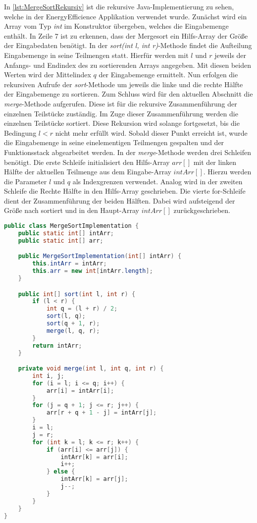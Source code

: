 In \autoref{lst:MergeSortRekursiv} ist die rekursive Java-Implementierung zu sehen, welche in der \glqq EnergyEfficience\grqq{} Applikation verwendet wurde. Zunächst wird ein Array vom Typ \emph{int} im Konstruktor übergeben, welches die Eingabemenge enthält. In Zeile 7 ist zu erkennen, dass der Mergesort ein Hilfs-Array der Größe der Eingabedaten benötigt. In der \emph{sort(int l, int r)}-Methode findet die Aufteilung Eingabemenge in seine Teilmengen statt. Hierfür werden mit $l$ und $r$ jeweils der Anfangs- und Endindex des zu sortierenden Arrays angegeben. Mit diesen beiden Werten wird der Mittelindex $q$ der Eingabemenge ermittelt. Nun erfolgen die rekursiven Aufrufe der \emph{sort}-Methode um jeweils die linke und die rechte Hälfte der Eingabemenge zu sortieren. Zum Schluss wird für den aktuellen Abschnitt die \emph{merge}-Methode aufgerufen. Diese ist für die rekursive Zusammenführung der einzelnen Teilstücke zuständig. Im Zuge dieser Zusammenführung werden die einzelnen Teilstücke sortiert. Diese Rekursion wird solange fortgesetzt, bis die Bedingung $l < r$ nicht mehr erfüllt wird. Sobald dieser Punkt erreicht ist, wurde die Eingabemenge in seine einelementigen Teilmengen gespalten und der Funktionsstack abgearbeitet werden. In der \emph{merge}-Methode werden drei Schleifen benötigt. Die erste Schleife initialisiert den Hilfs-Array $arr[]$ mit der linken Hälfte der aktuellen Teilmenge aus dem Eingabe-Array $intArr[]$. Hierzu werden die Parameter $l$ und $q$ als Indexgrenzen verwendet. Analog wird in der zweiten Schleife die Rechte Hälfte in den Hilfs-Array geschrieben. Die vierte for-Schleife dient der Zusammenführung der beiden Hälften. Dabei wird aufsteigend der Größe nach sortiert und in den Haupt-Array $intArr[]$ zurückgeschrieben.

\begin{lstlisting}[language=java,caption={rekursiver Merge sort (Quelle: \cite{MergeSortRekursiv})},label=lst:MergeSortRekursiv]
public class MergeSortImplementation {
    public static int[] intArr;
    public static int[] arr;

    public MergeSortImplementation(int[] intArr) {
        this.intArr = intArr;
        this.arr = new int[intArr.length];
    }

    public int[] sort(int l, int r) {
        if (l < r) {
            int q = (l + r) / 2;
            sort(l, q);
            sort(q + 1, r);
            merge(l, q, r);
        }
        return intArr;
    }

    private void merge(int l, int q, int r) {
        int i, j;
        for (i = l; i <= q; i++) {
            arr[i] = intArr[i];
        }
        for (j = q + 1; j <= r; j++) {
            arr[r + q + 1 - j] = intArr[j];
        }
        i = l;
        j = r;
        for (int k = l; k <= r; k++) {
            if (arr[i] <= arr[j]) {
                intArr[k] = arr[i];
                i++;
            } else {
                intArr[k] = arr[j];
                j--;
            }
        }
    }
}
\end{lstlisting}

